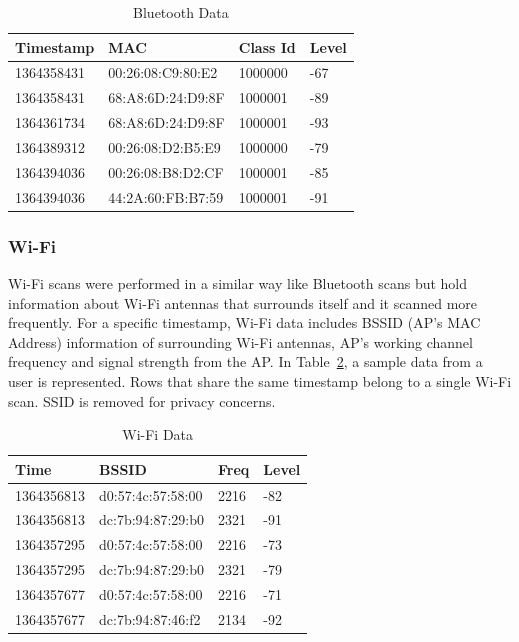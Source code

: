 \documentclass[12pt,oneandhalf,chaparabic,lfm,phd,eng,oneside,pntc]{gsufbe}
\begin{document}
\begin{table}[b!]
\centering
\caption{Bluetooth Data}
\label{tab:Bluetooth}
\begin{tabular}{|l|l|l|l|}
\hline
Timestamp   &    MAC   &     Class Id  &  Level \\ \hline
1364358431 & 00:26:08:C9:80:E2 & 1000000   & -67   \\
1364358431 & 68:A8:6D:24:D9:8F & 1000001   & -89   \\
1364361734 & 68:A8:6D:24:D9:8F & 1000001   & -93   \\
1364389312 & 00:26:08:D2:B5:E9 & 1000000   & -79   \\
1364394036 & 00:26:08:B8:D2:CF & 1000001   & -85   \\
1364394036 & 44:2A:60:FB:B7:59 & 1000001   & -91   \\ \hline
\end{tabular}
\end{table}


\subsubsection{Wi-Fi}
\label{subsubsec:Wi-Fi}
Wi-Fi scans were performed in a similar way like Bluetooth scans but hold information about Wi-Fi antennas that surrounds itself and it scanned more frequently. For a specific timestamp, Wi-Fi data includes BSSID (AP's MAC Address) information of surrounding Wi-Fi antennas, AP's working channel frequency and signal strength from the AP. In Table~\ref{tab:Wi-Fi}, a sample data from a user is represented. Rows that share the same timestamp belong to a single Wi-Fi scan. SSID is removed for privacy concerns. 

\begin{table}[b!]
\centering
\caption{Wi-Fi Data}
\label{tab:Wi-Fi}
\begin{tabular}{|l|l|l|l|}
\hline
Time       & BSSID             & Freq & Level \\ \hline
1364356813 & d0:57:4c:57:58:00 & 2216 & -82   \\
1364356813 & dc:7b:94:87:29:b0 & 2321 & -91   \\
1364357295 & d0:57:4c:57:58:00 & 2216 & -73   \\
1364357295 & dc:7b:94:87:29:b0 & 2321 & -79   \\
1364357677 & d0:57:4c:57:58:00 & 2216 & -71   \\
1364357677 & dc:7b:94:87:46:f2 & 2134 & -92   \\ \hline
\end{tabular}
\end{table}
\end{document}
